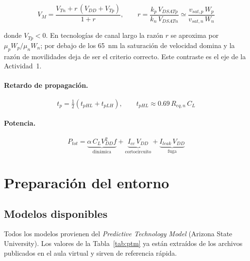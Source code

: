 \documentclass[11pt,a4paper]{article}
\begin{document}
\begin{equation}
V_M = \frac{V_{Tn} + r\,(V_{DD}+V_{Tp})}{1+r},
\qquad
r = \frac{k_p\,V_{DSATp}}{k_n\,V_{DSATn}} \simeq \frac{v_{sat,p}\,W_p}{v_{sat,n}\,W_n}
\label{eq:vm}
\end{equation}

\noindent donde $V_{Tp}<0$. En tecnologías de canal largo la razón $r$ se aproxima por $\mu_p W_p / \mu_n W_n$; por debajo de los 65~nm la saturación de velocidad domina y la razón de movilidades deja de ser el criterio correcto. Este contraste es el eje de la Actividad~1.

\paragraph{Retardo de propagación.}
\begin{equation}
t_p = \tfrac{1}{2}\left(t_{pHL}+t_{pLH}\right),
\qquad
t_{pHL} \approx 0.69\,R_{eq,n}\,C_L
\label{eq:tp}
\end{equation}

\paragraph{Potencia.}
\begin{equation}
P_{tot} = \underbrace{\alpha\,C_L V_{DD}^{2} f}_{\text{dinámica}}
        + \underbrace{I_{cc}\,V_{DD}}_{\text{cortocircuito}}
        + \underbrace{I_{leak}\,V_{DD}}_{\text{fuga}}
\label{eq:pot}
\end{equation}


\section{Preparación del entorno}


\subsection{Modelos disponibles}

Todos los modelos provienen del \emph{Predictive Technology Model} (Arizona State University). Los valores de la Tabla~\ref{tab:ptm} ya están extraídos de los archivos publicados en el aula virtual y sirven de referencia rápida.
\end{document}
